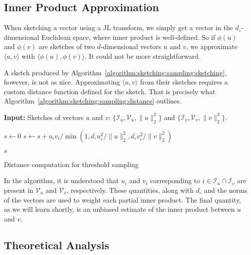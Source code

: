 \subsection{Inner Product Approximation}

When sketching a vector using a JL transform, we simply get a vector in the
$d_\circ$-dimensional Euclidean space, where inner product is well-defined.
So if $\phi(u)$ and $\phi(v)$ are sketches of two $d$-dimensional vectors $u$
and $v$, we approximate $\langle u, v \rangle$ with $\langle \phi(u), \phi(v) \rangle$.
It could not be more straightforward.

A sketch produced by Algorithm~\ref{algorithm:sketching:sampling:sketching}, however,
is not as nice. Approximating $\langle u, v \rangle$ from their sketches requires
a custom distance function defined for the sketch. That is precisely what
Algorithm~\ref{algorithm:sketching:sampling:distance} outlines.

\begin{algorithm}[!t]
\SetAlgoLined
{\bf Input: }{Sketches of vectors $u$ and $v$: $\{ \mathcal{I}_u, \mathcal{V}_u, \lVert u \rVert_2^2 \}$
and $\{ \mathcal{I}_v, \mathcal{V}_v, \lVert v \rVert_2^2 \}$.}\\

\begin{algorithmic}[1]
    \STATE $s \leftarrow 0$
        \STATE $s \leftarrow s + u_i v_i/\min ( 1, d_\circ u_i^2/\lVert u \rVert_2^2, d_\circ v_i^2/\lVert v \rVert_2^2 )$
    \ENDFOR
    
    \RETURN $s$
 \end{algorithmic}
 \caption{Distance computation for threshold sampling}
\label{algorithm:sketching:sampling:distance}
\end{algorithm}

In the algorithm, it is understood that $u_i$ and $v_i$ corresponding to
$i \in \mathcal{I}_u \cap \mathcal{I}_v$ are present in $\mathcal{V}_u$
and $\mathcal{V}_v$, respectively. These quantities, along with $d_\circ$
and the norms of the vectors are used to weight each partial inner product.
The final quantity, as we will learn shortly, is an unbiased estimate of
the inner product between $u$ and $v$.

\subsection{Theoretical Analysis}

